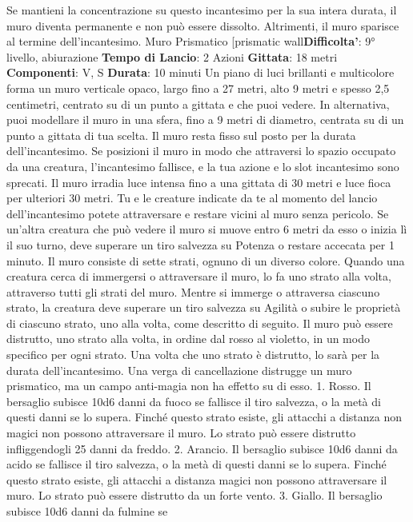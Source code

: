 \begin{multicols}{2}
Se mantieni la concentrazione su questo incantesimo
per la sua intera durata, il muro diventa permanente e
non può essere dissolto. Altrimenti, il muro sparisce al
termine dell’incantesimo.
Muro Prismatico
[prismatic wall\textbf{Difficolta'}:
9° livello, abiurazione
\textbf{Tempo di Lancio}: 2 Azioni
\textbf{Gittata}: 18 metri
\textbf{Componenti}: V, S
\textbf{Durata}: 10 minuti
Un piano di luci brillanti e multicolore forma un muro
verticale opaco, largo fino a 27 metri, alto 9 metri e
spesso 2,5 centimetri, centrato su di un punto a gittata
e che puoi vedere. In alternativa, puoi modellare il muro
in una sfera, fino a 9 metri di diametro, centrata su di un
punto a gittata di tua scelta. Il muro resta fisso sul posto
per la durata dell’incantesimo. Se posizioni il muro in
modo che attraversi lo spazio occupato da una
creatura, l’incantesimo fallisce, e la tua azione e lo slot
incantesimo sono sprecati.
Il muro irradia luce intensa fino a una gittata di 30 metri
e luce fioca per ulteriori 30 metri. Tu e le creature
indicate da te al momento del lancio dell’incantesimo
potete attraversare e restare vicini al muro senza
pericolo. Se un’altra creatura che può vedere il muro si
muove entro 6 metri da esso o inizia lì il suo turno, deve
superare un tiro salvezza su Potenza o restare
accecata per 1 minuto.
Il muro consiste di sette strati, ognuno di un diverso
colore. Quando una creatura cerca di immergersi o
attraversare il muro, lo fa uno strato alla volta,
attraverso tutti gli strati del muro. Mentre si immerge o
attraversa ciascuno strato, la creatura deve superare un
tiro salvezza su Agilità o subire le proprietà di
ciascuno strato, uno alla volta, come descritto di
seguito.
Il muro può essere distrutto, uno strato alla volta, in
ordine dal rosso al violetto, in un modo specifico per
ogni strato. Una volta che uno strato è distrutto, lo sarà
per la durata dell’incantesimo. Una verga di
cancellazione distrugge un muro prismatico, ma un
campo anti-magia non ha effetto su di esso.
1. Rosso. Il bersaglio subisce 10d6 danni da fuoco se
fallisce il tiro salvezza, o la metà di questi danni se lo
supera. Finché questo strato esiste, gli attacchi a
distanza non magici non possono attraversare il muro. 
Lo strato può essere distrutto infliggendogli 25 danni da
freddo.
2. Arancio. Il bersaglio subisce 10d6 danni da acido se
fallisce il tiro salvezza, o la metà di questi danni se lo
supera. Finché questo strato esiste, gli attacchi a
distanza magici non possono attraversare il muro. Lo
strato può essere distrutto da un forte vento.
3. Giallo. Il bersaglio subisce 10d6 danni da fulmine se

\end{multicols}
